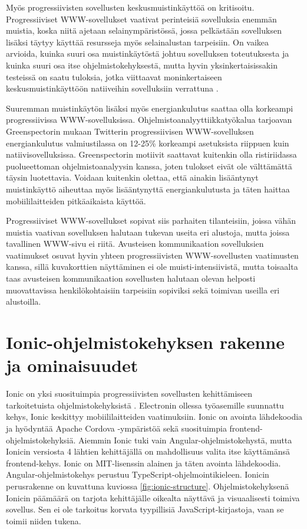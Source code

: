 \documentclass[utf8]{gradu3}
\begin{document}
Myös progressiivisten sovellusten keskusmuistinkäyttöä on kritisoitu. Progressiiviset WWW-sovellukset vaativat perinteisiä sovelluksia enemmän muistia, koska niitä ajetaan selainympäristössä, jossa pelkästään sovelluksen lisäksi täytyy käyttää resursseja myös selainalustan tarpeisiin. On vaikea arvioida, kuinka suuri osa muistinkäytöstä johtuu sovelluksen toteutuksesta ja kuinka suuri osa itse ohjelmistokehyksestä, mutta hyvin yksinkertaisissakin testeissä on saatu tuloksia, jotka viittaavat moninkertaiseen keskusmuistinkäyttöön natiiveihin sovelluksiin verrattuna \parencite[]{electron-memory-usage}.

Suuremman muistinkäytön lisäksi myös energiankulutus saattaa olla korkeampi progressiivissa WWW-sovelluksissa. Ohjelmistoanalyyttiikkatyökalua tarjoavan Greenspectorin mukaan \parencite[]{pwa-power-usage} Twitterin progressiivisen WWW-sovelluksen energiankulutus valmiustilassa on 12-25\% korkeampi asetuksista riippuen kuin natiivisovelluksissa. Greenspectorin motiivit saattavat kuitenkin olla ristiriidassa puolueettoman ohjelmistoanalyysin kanssa, joten tulokset eivät ole välttämättä täysin luotettavia. Voidaan kuitenkin olettaa, että ainakin lisääntynyt muistinkäyttö aiheuttaa myös lisääntynyttä energiankulutusta ja täten haittaa mobiililaitteiden pitkäaikaista käyttöä.

Progressiiviset WWW-sovellukset sopivat siis parhaiten tilanteisiin, joissa vähän muistia vaativan sovelluksen halutaan tukevan useita eri alustoja, mutta joissa tavallinen WWW-sivu ei riitä. Avusteisen kommunikaation sovelluksien vaatimukset osuvat hyvin yhteen progressiivisten WWW-sovellusten vaatimusten kanssa, sillä kuvakorttien näyttäminen ei ole muisti-intensiivistä, mutta toisaalta taas avusteisen kommunikaation sovellusten halutaan olevan helposti muovattavissa henkilökohtaisiin tarpeisiin sopiviksi sekä toimivan useilla eri alustoilla.

\section{Ionic-ohjelmistokehyksen rakenne ja ominaisuudet}

Ionic on yksi suosituimpia progressiivisten sovellusten kehittämiseen tarkoitetuista ohjelmistokehyksistä \parencite[]{ionic-marketshare}. Electronin ollessa työasemille suunnattu kehys, Ionic keskittyy mobiililaitteiden vaatimuksiin. Ionic on avointa lähdekoodia ja hyödyntää Apache Cordova -ympäristöä sekä suosituimpia frontend-ohjelmistokehyksiä. Aiemmin Ionic tuki vain Angular-ohjelmistokehystä, mutta Ionicin versiosta 4 lähtien kehittäjällä on mahdollisuus valita itse käyttämänsä frontend-kehys. Ionic on MIT-lisenssin alainen ja täten avointa lähdekoodia. Angular-ohjelmistokehys perustuu TypeScript-ohjelmointikieleen. Ionicin perusrakenne on kuvattuna kuviossa \ref{fig:ionic-structure}. Ohjelmistokehyksenä Ionicin päämäärä on tarjota kehittäjälle oikealta näyttävä ja visuaalisesti toimiva sovellus. Sen ei ole tarkoitus korvata tyypillisiä JavaScript-kirjastoja, vaan se toimii niiden tukena. \parencite[]{ionic-documentation}
\end{document}
